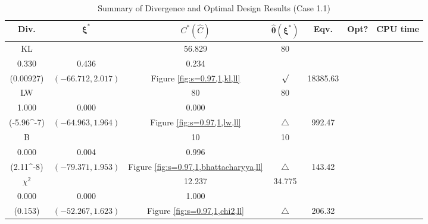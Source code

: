 \documentclass[12pt, a4paper]{article}
\begin{document}
\begin{table}[H]
\centering
\renewcommand{\arraystretch}{1.5} %
\setlength{\tabcolsep}{8pt} %
\begin{tabular}{|c|c|c|c|c|c|c|}
\hline
\textbf{Div.} & \(\boldsymbol{\xi^*}\) & \(C^* (\hat{C})\) & \(\boldsymbol{\hat{\theta}(\xi^*)}\) & \textbf{Eqv.} & \textbf{Opt?} & \textbf{CPU time} \\
\hline
KL & \(\left\{\begin{array}{ccc}
33.554 & 56.829 & 80 \\
0.330 & 0.436 & 0.234
\end{array}\right\}\) &
\(\begin{array}{c}
0.00927 \\
(0.00927)
\end{array}\) & 
\((-66.712, 2.017)\) & 
Figure \ref{fig:s=0.97,1,kl,ll} & $\surd$ & 18385.63 \\
\hline
LW & \(\left\{\begin{array}{ccc}
68.674 & 80 & 80 \\
1.000 & 0.000 & 0.000
\end{array}\right\}\) &
\(\begin{array}{c}
0.705 \\
(-5.96\times 10^{-7})
\end{array}\) & 
\((-64.963, 1.964)\) & 
Figure \ref{fig:s=0.97,1,lw,ll} & $\triangle$ & 992.47 \\
\hline
B & \(\left\{\begin{array}{ccc}
10 & 10 & 10 \\
0.000 & 0.004 & 0.996
\end{array}\right\}\) &
\(\begin{array}{c}
1 \\
(2.11\times 10^{-8})
\end{array}\) & 
\((-79.371, 1.953)\) & 
Figure \ref{fig:s=0.97,1,bhattacharyya,ll} & $\triangle$ & 143.42 \\
\hline
\(\chi^2\) & \(\left\{\begin{array}{ccc}
10 & 12.237 & 34.775 \\
0.000 & 0.000 & 1.000
\end{array}\right\}\) &
\(\begin{array}{c}
0.0397 \\
(0.153)
\end{array}\) & 
\((-52.267, 1.623)\) & 
Figure \ref{fig:s=0.97,1,chi2,ll} & $\triangle$ & 206.32 \\
\hline
\end{tabular}
\caption{Summary of Divergence and Optimal Design Results (Case 1.1)}
\label{tab:results1.1}
\end{table}
\end{document}
